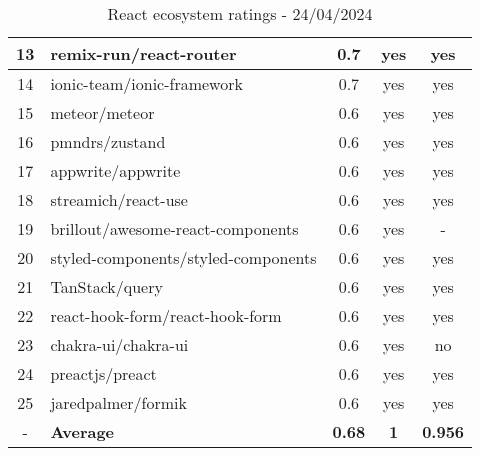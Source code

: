 \begin{table}[H]
{\begin{tabular}{|c|l|c|c|c|}
            13 & remix-run/react-router              & 0.7                & yes                        & yes                \\ \hline
            14 & ionic-team/ionic-framework          & 0.7                & yes                        & yes                \\ \hline
            15 & meteor/meteor                       & 0.6                & yes                        & yes                \\ \hline
            16 & pmndrs/zustand                      & 0.6                & yes                        & yes                \\ \hline
            17 & appwrite/appwrite                   & 0.6                & yes                        & yes                \\ \hline
            18 & streamich/react-use                 & 0.6                & yes                        & yes                \\ \hline
            19 & brillout/awesome-react-components   & 0.6                & yes                        & -                  \\ \hline
            20 & styled-components/styled-components & 0.6                & yes                        & yes                \\ \hline
            21 & TanStack/query                      & 0.6                & yes                        & yes                \\ \hline
            22 & react-hook-form/react-hook-form     & 0.6                & yes                        & yes                \\ \hline
            23 & chakra-ui/chakra-ui                 & 0.6                & yes                        & no                 \\ \hline
            24 & preactjs/preact                     & 0.6                & yes                        & yes                \\ \hline
            25 & jaredpalmer/formik                  & 0.6                & yes                        & yes                \\ \hline
            -  & \textbf{Average}                    & \textbf{0.68}      & \textbf{1}                 & \textbf{0.956}     \\ \hline
        \end{tabular}
    }
    \caption{React ecosystem ratings - 24/04/2024}
    \label{tab:metrics:react:ratings}
\end{table}

